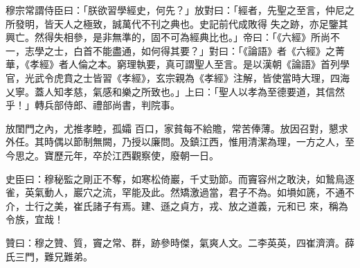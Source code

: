 \begin{pinyinscope}
 穆宗常謂侍臣曰：「朕欲習學經史，何先？」放對曰：「經者，先聖之至言，仲尼之所發明，皆天人之極致，誠萬代不刊之典也。史記前代成敗得
 失之跡，亦足鑒其興亡。然得失相參，是非無準的，固不可為經典比也。」帝曰：「《六經》所尚不一，志學之士，白首不能盡通，如何得其要？」對曰：「《論語》者《六經》之菁華，《孝經》者人倫之本。窮理執要，真可謂聖人至言。是以漢朝《論語》首列學官，光武令虎賁之士皆習《孝經》，玄宗親為《孝經》注解，皆使當時大理，四海乂寧。蓋人知孝慈，氣感和樂之所致也。」上曰：「聖人以孝為至德要道，其信然乎！」轉兵部侍郎、禮部尚書，判院事。



 放閨門之內，尤推孝睦，孤孀
 百口，家貧每不給贍，常苦俸薄。放因召對，懇求外任。其時偶以節制無闕，乃授以廉問。及鎮江西，惟用清潔為理，一方之人，至今思之。寶歷元年，卒於江西觀察使，廢朝一日。



 史臣曰：穆秘監之剛正不奪，如寒松倚巖，千丈勁節。而竇容州之敢決，如鷙鳥逐雀，英氣動人，巖穴之流，罕能及此。然矯激過當，君子不為。如塤如篪，不通不介，士行之美，崔氏諸子有焉。建、遜之貞方，戎、放之道義，元和已
 來，稱為令族，宜哉！



 贊曰：穆之贊、質，竇之常、群，跡參時傑，氣爽人文。二李英英，四崔濟濟。薛氏三門，難兄難弟。



\end{pinyinscope}